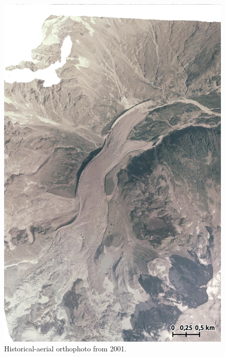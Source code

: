 \begin{figure}[p]
    \centering
    \includegraphics[height=\textheight]{figures/appendix/orto_2001.jpg}
    \caption{Historical-aerial orthophoto from 2001.}
\end{figure}

